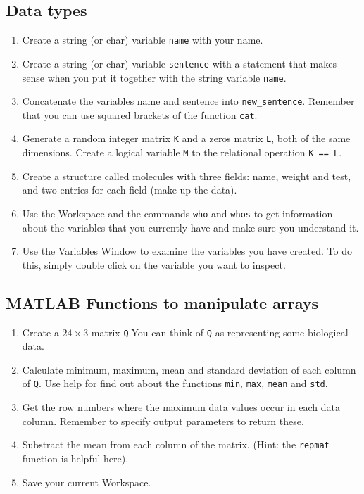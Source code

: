\documentclass[11pt]{amsart}
\begin{document}
\subsection{Data types}
\begin{enumerate}
\item Create a string (or char) variable \verb+name+ with your name.
\item Create a string (or char) variable \verb+sentence+ with a statement that makes sense when you put it together with the string variable \verb+name+. 
\item Concatenate the variables name and sentence into \verb+new_sentence+. Remember that you can use squared brackets of the function \verb+cat+.
\item Generate a random integer matrix \verb+K+ and a zeros matrix \verb+L+, both of the same dimensions. Create a logical variable \verb+M+ to the relational operation \verb+K == L+.
\item Create a structure called molecules with three fields: name, weight and test, and two entries for each field (make up the data).
\item Use the Workspace and the commands \verb+who+ and \verb+whos+ to get information about the variables that you currently have and make sure you understand it. 
\item Use the  Variables Window to examine the variables you have created. To do this, simply double click on the variable you want to inspect.
\end{enumerate}

\subsection{MATLAB Functions to manipulate arrays}
\begin{enumerate}
\item Create a $24 \times 3$ matrix \verb+Q+.You can think of \verb+Q+ as representing some biological data.
\item Calculate minimum, maximum, mean and standard deviation of each column of \verb+Q+. Use help for find out about the functions \verb+min+, \verb+max+, \verb+mean+ and \verb+std+.
\item Get the row numbers where the maximum data values occur in each data column. Remember to specify output parameters to return these. 
\item Substract the mean from each column of the matrix. (Hint: the \verb+repmat+ function is helpful here).
\item Save your current Workspace.
\end{enumerate}
\end{document}
